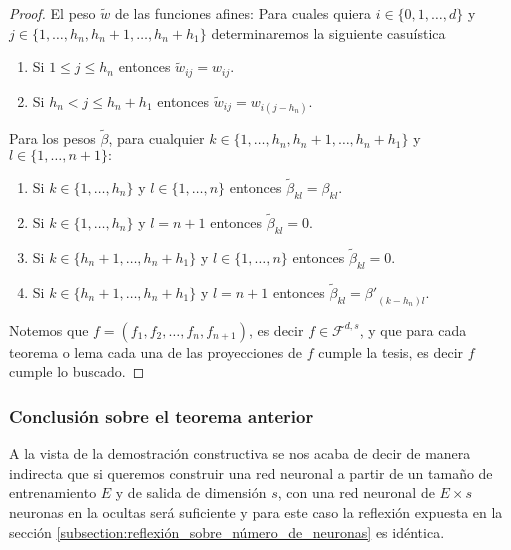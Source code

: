 \begin{proof}
    El peso $\tilde{w}$ de las funciones afines: 
    Para cuales quiera 
    $i \in \{0, 1, \ldots  , d \}$  y  
    $j \in \{1, \ldots , h_n, h_{n} + 1, \ldots, h_n + h_1\}$  determinaremos la siguiente casuística
    \begin{enumerate}
        \item Si $1 \leq j \leq h_n$ entonces $\tilde{w}_{i j} = w_{i j}.$
        \item Si $h_n < j \leq h_n + h_1$ entonces $\tilde{w}_{i j} = w_{i (j-h_n)}.$
    \end{enumerate}

    Para los pesos $\tilde{\beta}$, para cualquier
    $k \in \{1, \ldots , h_n, h_{n} + 1, \ldots, h_n + h_1\}$ y  
    $l \in \{1, \ldots ,  n+1 \} :$ 
    \begin{enumerate}
        \item Si $k \in \{1, \ldots ,  h_n \}$ y $l \in \{1, \ldots , n\}$ 
        entonces $\tilde{\beta}_{k l} = \beta_{k l}.$
        \item Si $k \in \{1, \ldots , h_n \}$ y $l=n+1$ 
        entonces $\tilde{\beta}_{k l} = 0.$
        \item Si $k \in \{h_{n} + 1, \ldots, h_n + h_1 \}$ 
        y $l \in \{1, \ldots , n\}$ 
        entonces $\tilde{\beta}_{k l} = 0.$
        \item Si $k \in \{h_{n} + 1, \ldots, h_n + h_1 \}$ 
        y $l=n+1$ 
        entonces 
        $\tilde{\beta}_{k l} = {\beta '}_{(k- h_n) l}.$
    \end{enumerate}

    Notemos que $f=(f_1, f_2, \ldots, f_n, f_{n+1})$, es decir $f \in \mathcal{F}^{d,s}$, y que para cada teorema o lema
    cada una de las proyecciones de $f$ cumple la tesis, es decir $f$ cumple lo buscado. 
\end{proof}

\subsubsection*{ Conclusión sobre el teorema anterior}  
A la vista de la demostración constructiva se nos acaba de decir de manera indirecta que si queremos construir una red neuronal 
a partir de un tamaño de entrenamiento $E$ y de salida de dimensión $s$, 
con una red neuronal de $E \times s$ neuronas en la ocultas será suficiente y para este caso la reflexión expuesta en la sección \ref{subsection:reflexión_sobre_número_de_neuronas} es idéntica. 



